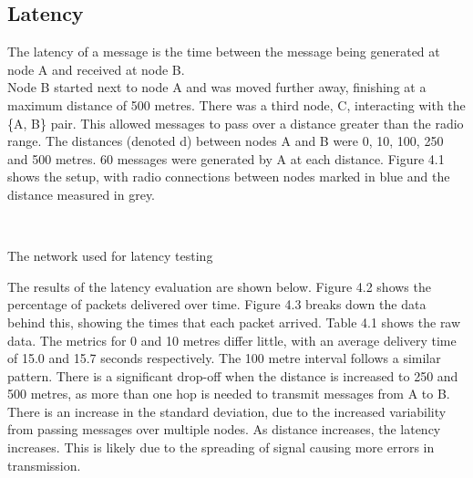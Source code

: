 \documentclass[12pt,a4paper]{report}
\makeatletter
\newenvironment{figurehere}
  {\def\@captype{figure}}
  {}
\makeatother
\begin{document}
\subsection{Latency}
The latency of a message is the time between the message being generated at node A and received at node B. \\
Node B started next to node A and was moved further away, finishing at a maximum distance of 500 metres. There was a third node, C, interacting with the \{A, B\} pair. This allowed messages to pass over a distance greater than the radio range. The distances (denoted d) between nodes A and B were 0, 10, 100, 250 and 500 metres. 60 messages were generated by A at each distance. Figure 4.1 shows the setup, with radio connections between nodes marked in blue and the distance measured in grey. 
\begin{figurehere}
\begin{center}
 \\
\end{center}
\caption{The network used for latency testing}
\end{figurehere}
\FloatBarrier
\bigskip
The results of the latency evaluation are shown below. Figure 4.2 shows the percentage of packets delivered over time. Figure 4.3 breaks down the data behind this, showing the times that each packet arrived. Table 4.1 shows the raw data. The metrics for 0 and 10 metres differ little, with an average delivery time of 15.0 and 15.7 seconds respectively. The 100 metre interval follows a similar pattern. There is a significant drop-off when the distance is increased to 250 and 500 metres, as more than one hop is needed to transmit messages from A to B. There is an increase in the standard deviation, due to the increased variability from passing messages over multiple nodes. As distance increases, the latency increases. This is likely due to the spreading of signal causing more errors in transmission. \\
\end{document}
